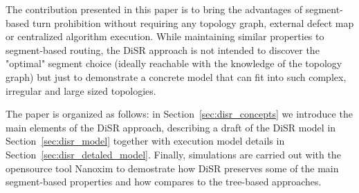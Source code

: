 The contribution presented in this paper is to bring the advantages of
segment-based turn prohibition without requiring any topology graph,
external defect map or centralized algorithm execution.  While
maintaining similar properties to segment-based routing, the DiSR
approach is not intended to discover the "optimal" segment choice
(ideally reachable with the knowledge of the topology graph) but just
to demonstrate a concrete model that can fit into such complex,
irregular and large sized topologies.

The paper is organized as follows: in Section~\ref{sec:disr_concepts}
we introduce the main elements of the DiSR approach, describing  
a draft of the DiSR model in Section~\ref{sec:disr_model}
together with execution model details in Section~\ref{sec:disr_detaled_model}.
Finally, simulations are carried out with the opensource tool Nanoxim
to demostrate how DiSR preserves some of the main segment-based
properties and how compares to the tree-based approaches.


